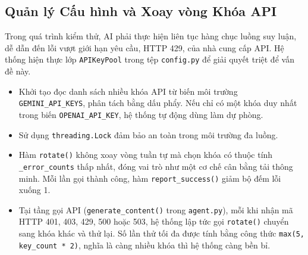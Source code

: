 \subsection{Quản lý Cấu hình và Xoay vòng Khóa API}
Trong quá trình kiểm thử, AI phải thực hiện liên tục hàng chục luồng suy luận, dễ dẫn đến lỗi vượt giới hạn yêu cầu, HTTP 429, của nhà cung cấp API. Hệ thống hiện thực lớp \texttt{APIKeyPool} trong tệp \texttt{config.py} để giải quyết triệt để vấn đề này.
\begin{itemize}
    \item Khởi tạo đọc danh sách nhiều khóa API từ biến môi trường \texttt{GEMINI\_API\_KEYS}, phân tách bằng dấu phẩy. Nếu chỉ có một khóa duy nhất trong biến \texttt{OPENAI\_API\_KEY}, hệ thống tự động dùng làm dự phòng.
    \item Sử dụng \texttt{threading.Lock} đảm bảo an toàn trong môi trường đa luồng.
    \item Hàm \texttt{rotate()} không xoay vòng tuần tự mà chọn khóa có thuộc tính \texttt{\_error\_counts} thấp nhất, đóng vai trò như một cơ chế cân bằng tải thông minh. Mỗi lần gọi thành công, hàm \texttt{report\_success()} giảm bộ đếm lỗi xuống 1.
    \item Tại tầng gọi API (\texttt{generate\_content()} trong \texttt{agent.py}), mỗi khi nhận mã HTTP 401, 403, 429, 500 hoặc 503, hệ thống lập tức gọi \texttt{rotate()} chuyển sang khóa khác và thử lại. Số lần thử tối đa được tính bằng công thức \texttt{max(5, key\_count * 2)}, nghĩa là càng nhiều khóa thì hệ thống càng bền bỉ.
\end{itemize}

